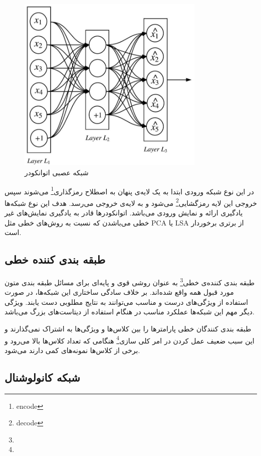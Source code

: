 \documentclass[12pt, a4paper, oneside]{report}
\begin{document}
\begin{figure}[!ht]
    \centering
    \includegraphics[width=0.80\textwidth]{autoencoder}
    \caption{شبکه عصبی اتوانکودر}
    \label{fig:autoencoder}
\end{figure}

در این نوع شبکه ورودی ابتدا به یک لایه‌ی پنهان به اصطلاح
رمزگذاری\footnote{encode}
می‌شوند سپس خروجی این لایه 
رمزگشایی\footnote{decode}
می‌شود و به لایه‌ی خروجی می‌رسد. هدف این نوع شبکه‌ها یادگیری ارائه‌ و نمایش ورودی می‌باشد. اتوانکودرها قادر به یادگیری
نمایش‌های غیر خطی می‌باشدن که نسبت به روش‌های خطی مثل
PCA
یا
LSA
از برتری برخوردار است.

\subsection{طبقه بندی کننده خطی}

طبقه بندی کننده‌ی خطی\footnote{}
به عنوان روشی قوی و پایه‌ای برای مسائل طبقه بندی متون مورد قبول همه واقع شده‌اند. بر خلاف
سادگی ساختاری این شبکه‌ها، در صورت استفاده از ویژگی‌های درست و مناسب می‌توانند به نتایج مطلوبی
دست‌ یابند. ویژگی دیگر مهم این شبکه‌ها عملکرد مناسب در هنگام استفاده از دیتاست‌های بزرگ می‌باشد\cite{joulin2016fasttext}.

طبقه بندی کنندگان خطی پارامترها را بین کلاس‌ها و ویژگی‌ها به اشتراک نمی‌گذارند و این سبب ضعیف عمل
کردن در امر
کلی سازی\footnote{}
هنگامی که تعداد کلاس‌ها بالا می‌رود و برخی از کلاس‌ها نمونه‌های کمی دارند می‌شود.

\subsection{شبکه کانولوشنال}
\end{document}
